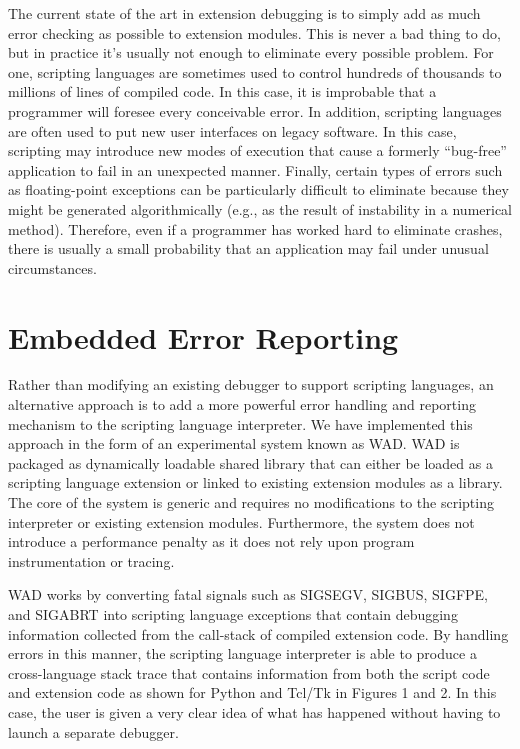 The current state of the art in extension debugging is to simply add
as much error checking as possible to extension modules. This is never
a bad thing to do, but in practice it's usually not enough to
eliminate every possible problem.  For one, scripting languages are
sometimes used to control hundreds of thousands to millions of lines
of compiled code.  In this case, it is improbable that a programmer will
foresee every conceivable error.  In addition, scripting languages are
often used to put new user interfaces on legacy software. In this
case, scripting may introduce new modes of execution that cause a
formerly ``bug-free'' application to fail in an unexpected manner.
Finally, certain types of errors such as floating-point exceptions can
be particularly difficult to eliminate because they might be generated
algorithmically (e.g., as the result of instability in a numerical
method). Therefore, even if a programmer has worked hard to eliminate
crashes, there is usually a small probability that an application may
fail under unusual circumstances.

\section{Embedded Error Reporting}

Rather than modifying an existing debugger to support scripting
languages, an alternative approach is to add a more powerful error
handling and reporting mechanism to the scripting language
interpreter.  We have implemented this approach in the form of an
experimental system known as WAD.  WAD is packaged as dynamically
loadable shared library that can either be loaded as a scripting
language extension or linked to existing extension modules as a
library.  The core of the system is generic and requires no
modifications to the scripting interpreter or existing extension
modules.  Furthermore, the system does not introduce a performance
penalty as it does not rely upon program instrumentation or tracing.

WAD works by converting fatal signals such as SIGSEGV,
SIGBUS, SIGFPE, and SIGABRT into scripting language exceptions that contain
debugging information collected from the call-stack of compiled
extension code.  By handling errors in this manner, the scripting
language interpreter is able to produce a cross-language stack trace that
contains information from both the script code and extension code as
shown for Python and Tcl/Tk in Figures 1 and 2.  In this case, the user
is given a very clear idea of what has happened without having
to launch a separate debugger. 

